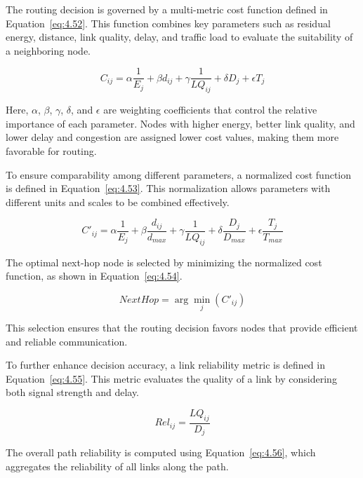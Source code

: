 \documentclass[a4paper,fleqn]{cas-dc}
\numberwithin{equation}{section}
\begin{document}
The routing decision is governed by a multi-metric cost function defined in Equation~\ref{eq:4.52}. This function combines key parameters such as residual energy, distance, link quality, delay, and traffic load to evaluate the suitability of a neighboring node.

\begin{equation}
C_{ij} = \alpha \frac{1}{E_j} + \beta d_{ij} + \gamma \frac{1}{LQ_{ij}} + \delta D_j + \epsilon T_j
\label{eq:4.52}
\end{equation}

Here, $\alpha$, $\beta$, $\gamma$, $\delta$, and $\epsilon$ are weighting coefficients that control the relative importance of each parameter. Nodes with higher energy, better link quality, and lower delay and congestion are assigned lower cost values, making them more favorable for routing.

To ensure comparability among different parameters, a normalized cost function is defined in Equation~\ref{eq:4.53}. This normalization allows parameters with different units and scales to be combined effectively.

\begin{equation}
C'_{ij} = \alpha \frac{1}{E_j} + \beta \frac{d_{ij}}{d_{max}} + \gamma \frac{1}{LQ_{ij}} + \delta \frac{D_j}{D_{max}} + \epsilon \frac{T_j}{T_{max}}
\label{eq:4.53}
\end{equation}

The optimal next-hop node is selected by minimizing the normalized cost function, as shown in Equation~\ref{eq:4.54}.

\begin{equation}
NextHop = \arg\min_j (C'_{ij})
\label{eq:4.54}
\end{equation}

This selection ensures that the routing decision favors nodes that provide efficient and reliable communication.

To further enhance decision accuracy, a link reliability metric is defined in Equation~\ref{eq:4.55}. This metric evaluates the quality of a link by considering both signal strength and delay.

\begin{equation}
Rel_{ij} = \frac{LQ_{ij}}{D_j}
\label{eq:4.55}
\end{equation}

The overall path reliability is computed using Equation~\ref{eq:4.56}, which aggregates the reliability of all links along the path.
\end{document}
